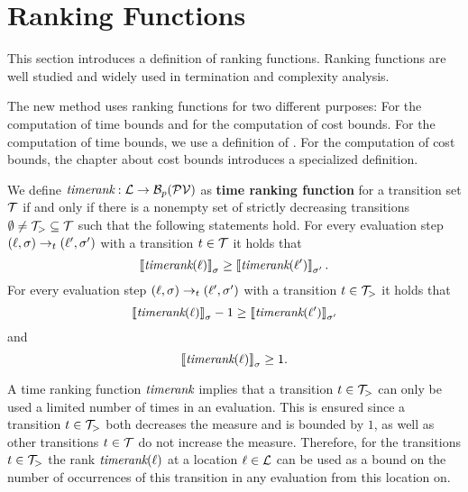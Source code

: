 \section{Ranking Functions}

This section introduces a definition of ranking functions.
Ranking functions are well studied \cite{bradley2005polyranking, podelski2004prf, bradley2005linear, bagnara2012new, leike2014ranking, ben2013linear} and widely used in termination and complexity analysis.

The new method uses ranking functions for two different purposes:
For the computation of time bounds and for the computation of cost bounds.
For the computation of time bounds, we use a definition of \cite{koat}.
For the computation of cost bounds, the chapter about cost bounds introduces a specialized definition.

\begin{definition} 
  We define $\emph{timerank}: \mathcal{L} \rightarrow \mathcal{B}_p(\mathcal{PV})$ as \textbf{time ranking function} for a transition set $\mathcal{T}$ if and only if there is a nonempty set of strictly decreasing transitions $\emptyset \neq \mathcal{T}_{>} \subseteq \mathcal{T}$ such that the following statements hold.
  For every evaluation step $(\ell, \sigma) \rightarrow_t (\ell', \sigma')$ with a transition $t \in \mathcal{T}$ it holds that
  \[ \left\llbracket \emph{timerank}(\ell) \right\rrbracket_{\sigma} \geq \left\llbracket \emph{timerank}(\ell') \right\rrbracket_{\sigma'}. \]
  For every evaluation step $(\ell, \sigma) \rightarrow_t (\ell', \sigma')$ with a transition $t \in \mathcal{T}_{>}$ it holds that        
  \[ \left\llbracket \emph{timerank}(\ell) \right\rrbracket_{\sigma} - 1 \geq \left\llbracket \emph{timerank}(\ell') \right\rrbracket_{\sigma'} \]
  and
  \[ \left\llbracket \emph{timerank}(\ell) \right\rrbracket_{\sigma} \geq 1. \]
\end{definition}

A time ranking function $\emph{timerank}$ implies that a transition $t \in \mathcal{T}_>$ can only be used a limited number of times in an evaluation.
This is ensured since a transition $t \in \mathcal{T}_>$ both decreases the measure and is bounded by $1$, as well as other transitions $t \in \mathcal{T}$ do not increase the measure.
Therefore, for the transitions $t \in \mathcal{T}_>$ the rank $\emph{timerank}(\ell)$ at a location $\ell \in \mathcal{L}$ can be used as a bound on the number of occurrences of this transition in any evaluation from this location on.


